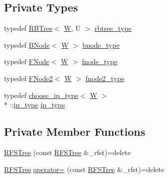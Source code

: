 \subsection*{Private Types}
\begin{DoxyCompactItemize}
\item 
typedef \hyperlink{classRBTree}{R\-B\-Tree}$<$ \hyperlink{test__u128_8cpp_ab21b528bc38899d04d3a7053e52fb797}{W}, U $>$ \hyperlink{classRFSTree_a883be6d647fcf136a9e6903985387134}{rbtree\-\_\-type}
\item 
typedef \hyperlink{structBNode}{B\-Node}$<$ \hyperlink{test__u128_8cpp_ab21b528bc38899d04d3a7053e52fb797}{W} $>$ \hyperlink{classRFSTree_a14c0aee24b9913173d3d9aaa93a6e3ce}{bnode\-\_\-type}
\item 
typedef \hyperlink{structFNode}{F\-Node}$<$ \hyperlink{test__u128_8cpp_ab21b528bc38899d04d3a7053e52fb797}{W} $>$ \hyperlink{classRFSTree_a82d6848400f7c2700a6283cb34bca3eb}{fnode\-\_\-type}
\item 
typedef \hyperlink{structFNode2}{F\-Node2}$<$ \hyperlink{test__u128_8cpp_ab21b528bc38899d04d3a7053e52fb797}{W} $>$ \hyperlink{classRFSTree_a0546714395e729135c856124425e97be}{fnode2\-\_\-type}
\item 
typedef \hyperlink{types_8h_structchoose__ip__type}{choose\-\_\-ip\-\_\-type}$<$ \hyperlink{test__u128_8cpp_ab21b528bc38899d04d3a7053e52fb797}{W} $>$\\*
\-::\hyperlink{classRFSTree_a7cb02a7e27a8d7ff16271e33dbba26eb}{ip\-\_\-type} \hyperlink{classRFSTree_a7cb02a7e27a8d7ff16271e33dbba26eb}{ip\-\_\-type}
\end{DoxyCompactItemize}
\subsection*{Private Member Functions}
\begin{DoxyCompactItemize}
\item 
\hyperlink{classRFSTree_a9343be56bc59357f4ecf6613f240547b}{R\-F\-S\-Tree} (const \hyperlink{classRFSTree}{R\-F\-S\-Tree} \&\-\_\-rfst)=delete
\item 
\hyperlink{classRFSTree}{R\-F\-S\-Tree} \hyperlink{classRFSTree_a69182e5f3d8704e6e2d4adfc7703d9e5}{operator=} (const \hyperlink{classRFSTree}{R\-F\-S\-Tree} \&\-\_\-rfst)=delete
\end{DoxyCompactItemize}
